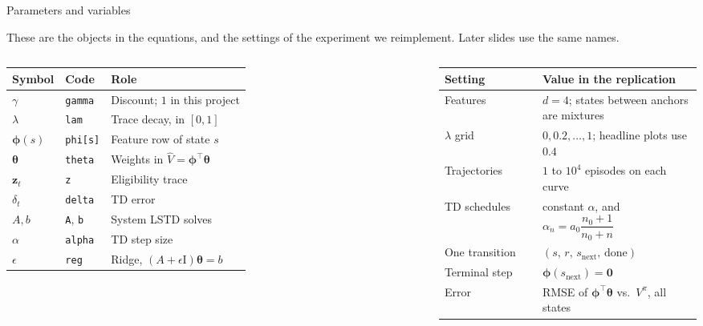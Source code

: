 \documentclass[aspectratio=169,11pt]{beamer}
\newcommand{\memberA}{Member A}
\newcommand{\speaker}[1]{} %
\newcommand{\vphi}{\bm{\phi}}
\newcommand{\vz}{\mathbf{z}}
\newcommand{\vth}{\bm{\theta}}
\begin{document}
\begin{frame}{Parameters and variables}
  \speaker{\memberA}
  \small
  These are the objects in the equations, and the settings of the experiment we reimplement. Later slides use the same names.
  \vspace{0.45em}
  \begin{columns}[T]
    \scriptsize
    \renewcommand{\arraystretch}{1.08}%
    \begin{tabular}{@{}lll@{}}
      \toprule
      \textbf{Symbol} & \textbf{Code} & \textbf{Role} \\
      \midrule
      $\gamma$ & \texttt{gamma} & Discount; $1$ in this project \\
      $\lambda$ & \texttt{lam} & Trace decay, in $[0,1]$ \\
      $\vphi(s)$ & \texttt{phi[s]} & Feature row of state $s$ \\
      $\vth$ & \texttt{theta} & Weights in $\hat V=\vphi^\top\vth$ \\
      $\vz_t$ & \texttt{z} & Eligibility trace \\
      $\delta_t$ & \texttt{delta} & TD error \\
      $A,b$ & \texttt{A}, \texttt{b} & System LSTD solves \\
      $\alpha$ & \texttt{alpha} & TD step size \\
      $\epsilon$ & \texttt{reg} & Ridge, $(A+\epsilon \mathrm{I})\vth=b$ \\
      \bottomrule
    \end{tabular}
    \scriptsize
    \renewcommand{\arraystretch}{1.08}%
    \begin{tabular}{@{}lp{0.62\linewidth}@{}}
      \toprule
      \textbf{Setting} & \textbf{Value in the replication} \\
      \midrule
      Features & $d=4$; states between anchors are mixtures \\
      $\lambda$ grid & $0,0.2,\ldots,1$; headline plots use $0.4$ \\
      Trajectories & $1$ to $10^4$ episodes on each curve \\
      TD schedules & constant $\alpha$, and $\alpha_n=a_0\dfrac{n_0+1}{n_0+n}$ \\
      One transition & $(s,\, r,\, s_{\mathrm{next}},\, \mathrm{done})$ \\
      Terminal step & $\vphi(s_{\mathrm{next}})=\mathbf{0}$ \\
      Error & RMSE of $\vphi^\top\vth$ vs.\ $V^\pi$, all states \\
      \bottomrule
    \end{tabular}
  \end{columns}
\end{frame}
\end{document}
